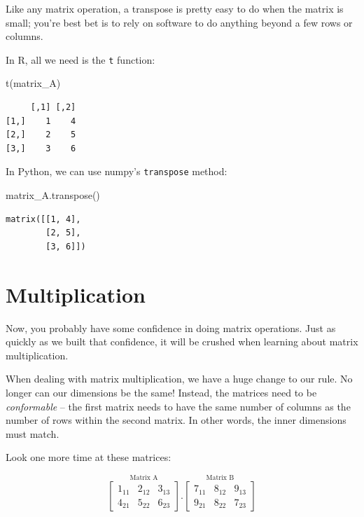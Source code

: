 \documentclass[
  letterpaper,
]{krantz}
\newenvironment{Shaded}{}{}
\newcommand{\FunctionTok}[1]{\textcolor[rgb]{0.02,0.16,0.49}{#1}}
\newcommand{\NormalTok}[1]{#1}
\begin{document}
Like any matrix operation, a transpose is pretty easy to do when the
matrix is small; you're best bet is to rely on software to do anything
beyond a few rows or columns.

In R, all we need is the \texttt{t} function:

\begin{Shaded}
\begin{Highlighting}[]
\FunctionTok{t}\NormalTok{(matrix\_A)}
\end{Highlighting}
\end{Shaded}

\begin{verbatim}
     [,1] [,2]
[1,]    1    4
[2,]    2    5
[3,]    3    6
\end{verbatim}

In Python, we can use numpy's \texttt{transpose} method:

\begin{Shaded}
\begin{Highlighting}[]
\NormalTok{matrix\_A.transpose()}
\end{Highlighting}
\end{Shaded}

\begin{verbatim}
matrix([[1, 4],
        [2, 5],
        [3, 6]])
\end{verbatim}

\section{Multiplication}\label{multiplication}

Now, you probably have some confidence in doing matrix operations. Just
as quickly as we built that confidence, it will be crushed when learning
about matrix multiplication.

When dealing with matrix multiplication, we have a huge change to our
rule. No longer can our dimensions be the same! Instead, the matrices
need to be \emph{conformable} -- the first matrix needs to have the same
number of columns as the number of rows within the second matrix. In
other words, the inner dimensions must match.

Look one more time at these matrices:

\[
\stackrel{\mbox{Matrix A}}{
\begin{bmatrix}
1_{11} & 2_{12} & 3_{13}\\
4_{21} & 5_{22} & 6_{23}
\end{bmatrix}
}
.
\stackrel{\mbox{Matrix B}}{
\begin{bmatrix}
7_{11} & 8_{12} & 9_{13}\\
9_{21} & 8_{22} & 7_{23}
\end{bmatrix} 
}
\]
\end{document}
